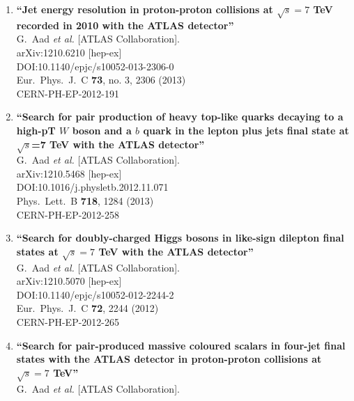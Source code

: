 \documentclass{article}
\begin{document}
\begin{enumerate}
\item%
{\bf ``Jet energy resolution in proton-proton collisions at $\sqrt{s}=7$ TeV recorded in 2010 with the ATLAS detector''}
  \\{}G.~Aad {\it et al.} [ATLAS Collaboration].
  \\{}arXiv:1210.6210 [hep-ex]
  \\{}DOI:10.1140/epjc/s10052-013-2306-0
  \\{}Eur.\ Phys.\ J.\ C {\bf 73}, no. 3, 2306 (2013)
  \\{}CERN-PH-EP-2012-191
\item%
{\bf ``Search for pair production of heavy top-like quarks decaying to a high-pT $W$ boson and a $b$ quark in the lepton plus jets final state at $\sqrt{s}$=7 TeV with the ATLAS detector''}
  \\{}G.~Aad {\it et al.} [ATLAS Collaboration].
  \\{}arXiv:1210.5468 [hep-ex]
  \\{}DOI:10.1016/j.physletb.2012.11.071
  \\{}Phys.\ Lett.\ B {\bf 718}, 1284 (2013)
  \\{}CERN-PH-EP-2012-258
\item%
{\bf ``Search for doubly-charged Higgs bosons in like-sign dilepton final states at $\sqrt{s}=7$ TeV with the ATLAS detector''}
  \\{}G.~Aad {\it et al.} [ATLAS Collaboration].
  \\{}arXiv:1210.5070 [hep-ex]
  \\{}DOI:10.1140/epjc/s10052-012-2244-2
  \\{}Eur.\ Phys.\ J.\ C {\bf 72}, 2244 (2012)
  \\{}CERN-PH-EP-2012-265
\item%
{\bf ``Search for pair-produced massive coloured scalars in four-jet final states with the ATLAS detector in proton-proton collisions at $\sqrt{s}=7$ TeV''}
  \\{}G.~Aad {\it et al.} [ATLAS Collaboration].

\end{enumerate}
\end{document}
